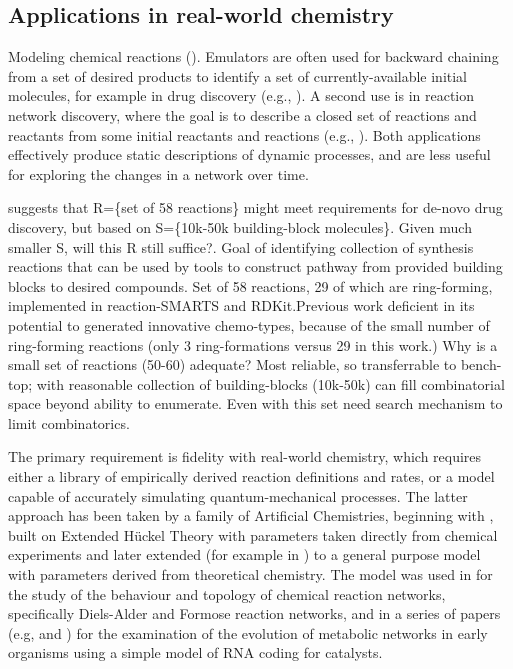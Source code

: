 \subsection{Applications in real-world chemistry}\label{applications-in-real-world-chemistry}

Modeling chemical reactions (\eg \autocite{Gibson:2000kx}). Emulators
are often used for backward chaining from a set of desired products to
identify a set of currently-available initial molecules, for example in
drug discovery (e.g., \autocite{Hartenfeller2011}). A second use is in
reaction network discovery, where the goal is to describe a closed set
of reactions and reactants from some initial reactants and reactions
(e.g., \autocite{Faulon2001}). Both applications effectively produce
static descriptions of dynamic processes, and are less useful for
exploring the changes in a network over time.

\autocite{Hartenfeller2012} suggests that
R=\{set of 58 reactions\} might meet requirements for de-novo drug
discovery, but based on S=\{10k-50k building-block molecules\}. Given
much smaller S, will this R still suffice?. Goal of identifying
collection of synthesis reactions that can be used by tools to construct
pathway from provided building blocks to desired compounds. Set of 58
reactions, 29 of which are ring-forming, implemented in reaction-SMARTS
and RDKit.Previous work deficient in its potential to generated
innovative chemo-types, because of the small number of ring-forming
reactions (only 3 ring-formations versus 29 in this work.) Why is a
small set of reactions (50-60) adequate? Most reliable, so transferrable
to bench-top; with reasonable collection of building-blocks (10k-50k)
can fill combinatorial space beyond ability to enumerate. Even with this
set need search mechanism to limit combinatorics.

The primary requirement is fidelity with real-world chemistry, which
requires either a library of empirically derived reaction definitions
and rates, or a model capable of accurately simulating
quantum-mechanical processes. The latter approach has been taken by a
family of Artificial Chemistries, beginning with
\autocite{Benko2003}, built on Extended H\"{u}ckel Theory with parameters
taken directly from chemical experiments and later extended (for example
in \autocite{Benko2005}) to a general purpose model with parameters
derived from theoretical chemistry. The model was used in
\autocite{Hogerl2010} for the study of the behaviour and topology of
chemical reaction networks, specifically Diels-Alder and Formose
reaction networks, and in a series of papers (e.g, \autocite{Flamm2010}
and \autocite{Ullrich2010}) for the examination of the evolution of
metabolic networks in early organisms using a simple model of RNA coding
for catalysts.

